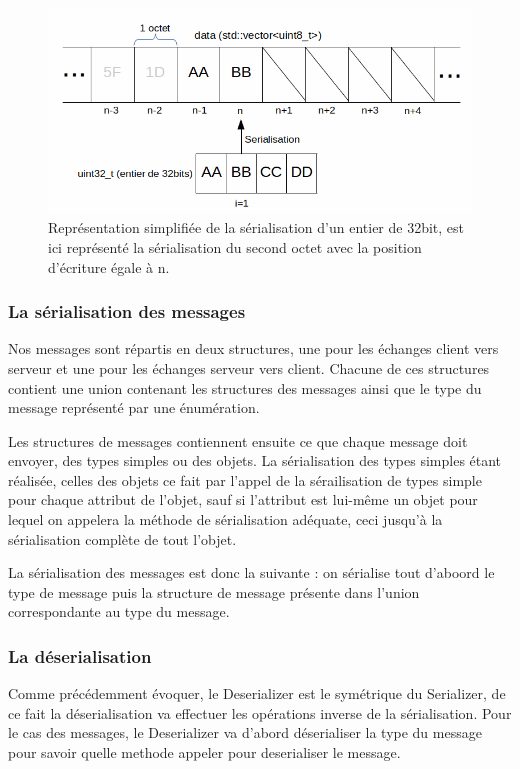 \documentclass[a4paper, 12pt]{article}
\begin{document}
\begin{figure}[bt]
	\centering
	\includegraphics[scale=0.35]{img/serialisation.png}
	\caption{Représentation simplifiée de la sérialisation d'un entier de 32bit, est ici représenté la sérialisation du second octet avec la position d'écriture égale à n.}
	\label{fig:serial}
\end{figure}

			\subsubsection{La sérialisation des messages}

			Nos messages sont répartis en deux structures, une pour les échanges client vers serveur et une pour les échanges serveur vers client. Chacune de ces structures contient une union contenant les structures des messages ainsi que le type du message représenté par une énumération.


			Les structures de messages contiennent ensuite ce que chaque message doit envoyer, des types simples ou des objets. La sérialisation des types simples étant réalisée, celles des objets ce fait par l'appel de la sérailisation de types simple pour chaque attribut de l'objet, sauf si l'attribut est lui-même un objet pour lequel on appelera la méthode de sérialisation adéquate, ceci jusqu'à la sérialisation complète de tout l'objet.
			

			La sérialisation des messages est donc la suivante : on sérialise tout d'aboord le type de message puis la structure de message présente dans l'union correspondante au type du message.

			\subsubsection{La déserialisation}

			Comme précédemment évoquer, le Deserializer est le symétrique du Serializer, de ce fait la déserialisation va effectuer les opérations inverse de la sérialisation. Pour le cas des messages, le Deserializer va d'abord déserialiser la type du message pour savoir quelle methode appeler pour deserialiser le message.
\end{document}
